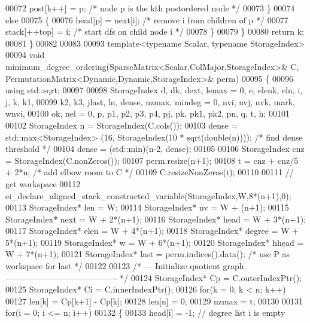 \begin{DoxyCode}
00072       post[k++] = p;        \textcolor{comment}{/* node p is the kth postordered node */}
00073     \}
00074     \textcolor{keywordflow}{else}
00075     \{
00076       head[p] = next[i];   \textcolor{comment}{/* remove i from children of p */}
00077       stack[++top] = i;     \textcolor{comment}{/* start dfs on child node i */}
00078     \}
00079   \}
00080   \textcolor{keywordflow}{return} k;
00081 \}
00082 
00083 
00093 \textcolor{keyword}{template}<\textcolor{keyword}{typename} Scalar, \textcolor{keyword}{typename} StorageIndex>
00094 \textcolor{keywordtype}{void} minimum\_degree\_ordering(SparseMatrix<Scalar,ColMajor,StorageIndex>& C, 
      PermutationMatrix<Dynamic,Dynamic,StorageIndex>& perm)
00095 \{
00096   \textcolor{keyword}{using} std::sqrt;
00097   
00098   StorageIndex d, dk, dext, lemax = 0, e, elenk, eln, i, j, k, k1,
00099                 k2, k3, jlast, ln, dense, nzmax, mindeg = 0, nvi, nvj, nvk, mark, wnvi,
00100                 ok, nel = 0, p, p1, p2, p3, p4, pj, pk, pk1, pk2, pn, q, t, h;
00101   
00102   StorageIndex n = StorageIndex(C.cols());
00103   dense = std::max<StorageIndex> (16, StorageIndex(10 * sqrt(\textcolor{keywordtype}{double}(n))));   \textcolor{comment}{/* find dense threshold */}
00104   dense = (std::min)(n-2, dense);
00105   
00106   StorageIndex cnz = StorageIndex(C.nonZeros());
00107   perm.resize(n+1);
00108   t = cnz + cnz/5 + 2*n;                 \textcolor{comment}{/* add elbow room to C */}
00109   C.resizeNonZeros(t);
00110   
00111   \textcolor{comment}{// get workspace}
00112   ei\_declare\_aligned\_stack\_constructed\_variable(StorageIndex,W,8*(n+1),0);
00113   StorageIndex* len     = W;
00114   StorageIndex* nv      = W +   (n+1);
00115   StorageIndex* next    = W + 2*(n+1);
00116   StorageIndex* head    = W + 3*(n+1);
00117   StorageIndex* elen    = W + 4*(n+1);
00118   StorageIndex* degree  = W + 5*(n+1);
00119   StorageIndex* w       = W + 6*(n+1);
00120   StorageIndex* hhead   = W + 7*(n+1);
00121   StorageIndex* last    = perm.indices().data();                              \textcolor{comment}{/* use P as workspace for
       last */}
00122   
00123   \textcolor{comment}{/* --- Initialize quotient graph ---------------------------------------- */}
00124   StorageIndex* Cp = C.outerIndexPtr();
00125   StorageIndex* Ci = C.innerIndexPtr();
00126   \textcolor{keywordflow}{for}(k = 0; k < n; k++)
00127     len[k] = Cp[k+1] - Cp[k];
00128   len[n] = 0;
00129   nzmax = t;
00130   
00131   \textcolor{keywordflow}{for}(i = 0; i <= n; i++)
00132   \{
00133     head[i]   = -1;                     \textcolor{comment}{// degree list i is empty}

\end{DoxyCode}
